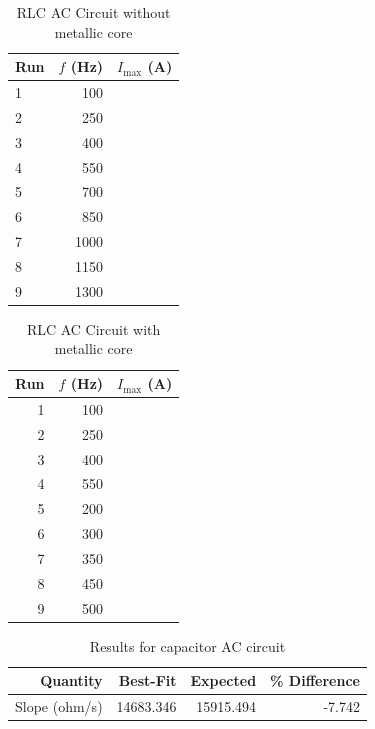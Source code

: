 \begin{table}[ht]
	\begin{center}
		\begin{tabular}{|l|r|r|}\hline
			Run & $f$ (Hz) & $I_{\text{max}}$ (A) \\
			\hline
			1 & 100 & \\
			2 & 250 & \\
			3 & 400 & \\
			4 & 550 & \\
			5 & 700 & \\
			6 & 850 & \\
			7 & 1000 & \\
			8 & 1150 & \\
			9 & 1300 & \\
			\hline
		\end{tabular}
	\end{center}
	\caption{RLC AC Circuit without metallic core}
	\label{table.RLC.student}
\end{table}
\begin{table}[ht]
	\begin{center}
		\begin{tabular}{|r|r|r|}\hline
			Run & $f$ (Hz) & $I_{\text{max}}$ (A) \\
			\hline
			1 & 100 & \\
			2 & 250 & \\
			3 & 400 & \\
			4 & 550 & \\
			5 & 200 & \\
			6 & 300 & \\
			7 & 350 & \\
			8 & 450 & \\
			9 & 500 & \\
			\hline
		\end{tabular}
	\end{center}
	\caption{RLC AC Circuit with metallic core}
	\label{table.RLCcore.student}
\end{table}
\begin{table}[ht]
	\begin{center}
		\begin{tabular}{|r|r|r|r|}
			\hline
			Quantity & Best-Fit & Expected & \% Difference \\
			\hline
			Slope (ohm/s) & 14683.346 & 15915.494 & -7.742 \\
			\hline
		\end{tabular}
	\end{center}
	\caption{Results for capacitor AC circuit}
	\label{table.results.C}
\end{table}
